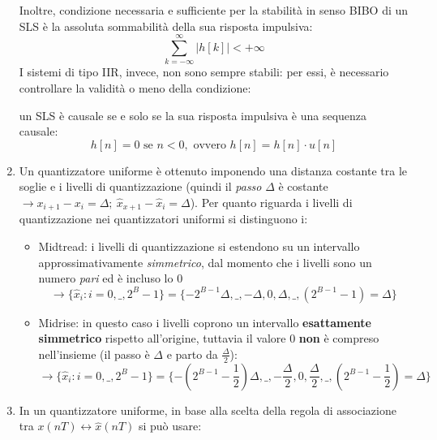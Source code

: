 \documentclass[
]{article}
\begin{document}
\begin{enumerate}
  Inoltre, condizione necessaria e sufficiente per la stabilità in senso
  BIBO di un SLS è la assoluta sommabilità della sua risposta impulsiva:
  \[
  \sum_{k=-\infty}^{\infty}\Big|h[k]\Big| < +\infty
  \] I sistemi di tipo IIR, invece, non sono sempre stabili: per essi, è
  necessario controllare la validità o meno della condizione:

  un SLS è causale se e solo se la sua risposta impulsiva è una sequenza
  causale: \[
  h[n] = 0 \text{ se } n < 0, \text{ ovvero } h[n] = h[n] \cdot u[n]
  \]
\item
  Un quantizzatore uniforme è ottenuto imponendo una distanza costante
  tra le soglie e i livelli di quantizzazione (quindi il \emph{passo}
  \(\Delta\) è costante
  \(\to x_{i+1}-x_i=\Delta; \ \hat{x}_{x+1}-\hat{x}_i = \Delta\)). Per
  quanto riguarda i livelli di quantizzazione nei quantizzatori uniformi
  si distinguono i:

  \begin{itemize}
  \item
    Midtread: i livelli di quantizzazione si estendono su un intervallo
    approssimativamente \emph{simmetrico}, dal momento che i livelli
    sono un numero \emph{pari} ed è incluso lo 0 \[
    \to \{\hat{x}_i : i=0,\_,2^B -1\}= \{-2^{B-1}\Delta,\_,-\Delta,0,\Delta,\_,(2^{B-1}-1)=\Delta \}
    \]
  \item
    Midrise: in questo caso i livelli coprono un intervallo
    \textbf{esattamente simmetrico} rispetto all'origine, tuttavia il
    valore 0 \textbf{non} è compreso nell'insieme (il passo è \(\Delta\)
    e parto da \(\frac{\Delta}{2}\)): \[
    \to \{\hat{x}_i : i=0,\_,2^B -1\}= \{-(2^{B-1}-\frac{1}{2})\Delta,\_,-\frac{\Delta}{2},0,\frac{\Delta}{2},\_,(2^{B-1}-\frac{1}{2})=\Delta \}
    \]
  \end{itemize}
\item
  In un quantizzatore uniforme, in base alla scelta della regola di
  associazione tra \(x(nT)\leftrightarrow \hat{x}(nT)\) si può usare:


\end{enumerate}
\end{document}
